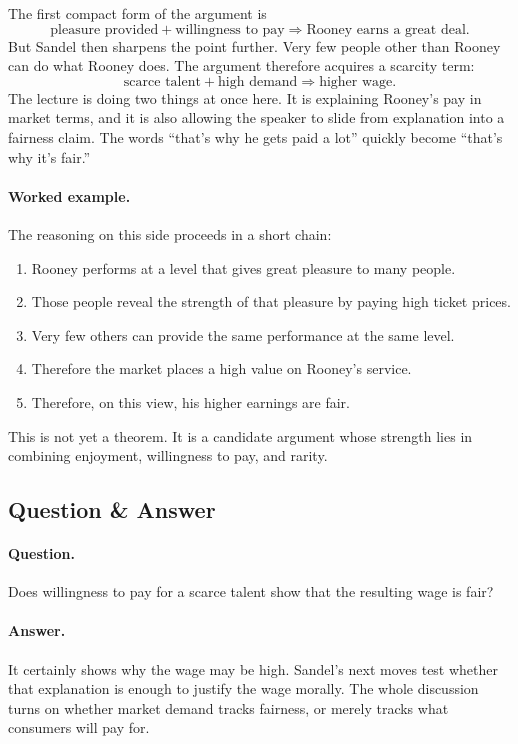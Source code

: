 The first compact form of the argument is
\begin{equation}
\text{pleasure provided} + \text{willingness to pay}
\Longrightarrow
\text{Rooney earns a great deal}.
\end{equation}
But Sandel then sharpens the point further. Very few people other than Rooney can do what Rooney does. The argument therefore acquires a scarcity term:
\begin{equation}
\text{scarce talent} + \text{high demand}
\Longrightarrow
\text{higher wage}.
\end{equation}
The lecture is doing two things at once here. It is explaining Rooney's pay in market terms, and it is also allowing the speaker to slide from explanation into a fairness claim. The words ``that's why he gets paid a lot'' quickly become ``that's why it's fair.''

\paragraph{Worked example.} The reasoning on this side proceeds in a short chain:
\begin{enumerate}
\item Rooney performs at a level that gives great pleasure to many people.
\item Those people reveal the strength of that pleasure by paying high ticket prices.
\item Very few others can provide the same performance at the same level.
\item Therefore the market places a high value on Rooney's service.
\item Therefore, on this view, his higher earnings are fair.
\end{enumerate}
This is not yet a theorem. It is a candidate argument whose strength lies in combining enjoyment, willingness to pay, and rarity.

\subsection{Question \& Answer}

\paragraph{Question.} Does willingness to pay for a scarce talent show that the resulting wage is fair?

\paragraph{Answer.} It certainly shows why the wage may be high. Sandel's next moves test whether that explanation is enough to justify the wage morally. The whole discussion turns on whether market demand tracks fairness, or merely tracks what consumers will pay for.

